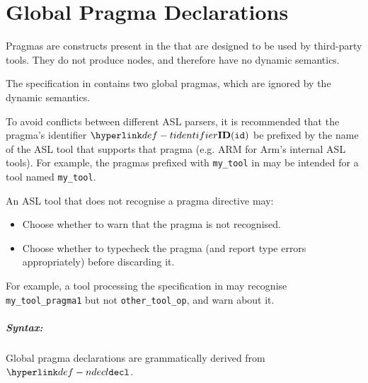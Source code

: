 \chapter{Global Pragma Declarations\label{chap:Global Pragma Declarations}}

Pragmas are constructs present in the \untypedast{} that are designed to be used
by third-party tools.
They do not produce \typedast{} nodes, and therefore have no dynamic semantics.

The specification in  contains two global pragmas,
which are ignored by the dynamic semantics.


To avoid conflicts between different ASL parsers, it is recommended that the pragma's identifier $\Tidentifier(\id)$ be prefixed by the name of the ASL tool that supports that pragma
(e.g. ARM for Arm's internal ASL tools).
For example, the pragmas prefixed with \verb|my_tool| in  may be intended for a tool named \verb|my_tool|.


An ASL tool that does not recognise a pragma directive may:
\begin{itemize}
  \item Choose whether to warn that the pragma is not recognised.
  \item Choose whether to typecheck the pragma (and report type errors appropriately) before discarding it.
\end{itemize}

For example, a tool processing the specification in  may recognise \\
\verb|my_tool_pragma1| but not \verb|other_tool_op|, and warn about it.

\ChapterOutline

\paragraph{Syntax:} Global pragma declarations are grammatically derived from $\Ndecl$.


